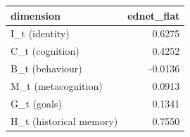 \begin{tabular}{lr}
\toprule
dimension & ednet\_flat \\
\midrule
I\_t (identity) & 0.6275 \\
C\_t (cognition) & 0.4252 \\
B\_t (behaviour) & -0.0136 \\
M\_t (metacognition) & 0.0913 \\
G\_t (goals) & 0.1341 \\
H\_t (historical memory) & 0.7550 \\
\bottomrule
\end{tabular}
